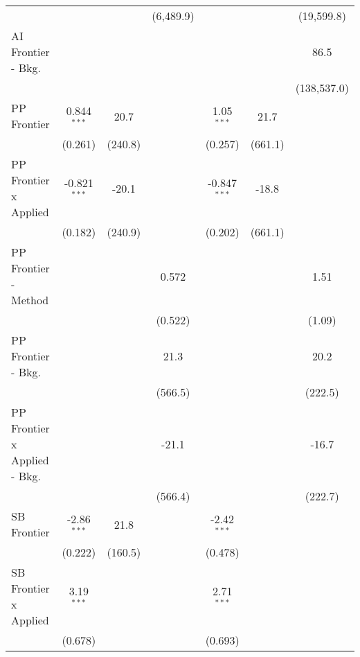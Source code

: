 \begin{tabular}{lcccccc}
                                &                &              & (6,489.9)   &                &             & (19,599.8)\\   
   AI Frontier - Bkg.           &                &              &             &                &             & 86.5\\   
                                &                &              &             &                &             & (138,537.0)\\   
   PP Frontier                  & 0.844$^{***}$  & 20.7         &             & 1.05$^{***}$   & 21.7        &   \\   
                                & (0.261)        & (240.8)      &             & (0.257)        & (661.1)     &   \\   
   PP Frontier x Applied        & -0.821$^{***}$ & -20.1        &             & -0.847$^{***}$ & -18.8       &   \\   
                                & (0.182)        & (240.9)      &             & (0.202)        & (661.1)     &   \\   
   PP Frontier - Method         &                &              & 0.572       &                &             & 1.51\\   
                                &                &              & (0.522)     &                &             & (1.09)\\   
   PP Frontier - Bkg.           &                &              & 21.3        &                &             & 20.2\\   
                                &                &              & (566.5)     &                &             & (222.5)\\   
   PP Frontier x Applied - Bkg. &                &              & -21.1       &                &             & -16.7\\   
                                &                &              & (566.4)     &                &             & (222.7)\\   
   SB Frontier                  & -2.86$^{***}$  & 21.8         &             & -2.42$^{***}$  &             &   \\   
                                & (0.222)        & (160.5)      &             & (0.478)        &             &   \\   
   SB Frontier x Applied        & 3.19$^{***}$   &              &             & 2.71$^{***}$   &             &   \\   
                                & (0.678)        &              &             & (0.693)        &             &   \\   

\end{tabular}
